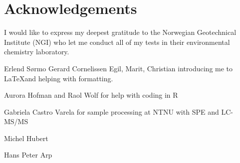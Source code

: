 \newpage
{}
\section*{Acknowledgements}
I would like to express my deepest gratitude to the Norwegian Geotechnical Institute (NGI) who let me conduct all of my tests in their environmental chemistry laboratory.

Erlend Sørmo
Gerard Cornelissen
Egil, Marit, Christian introducing me to  \LaTeX and helping with formatting.

Aurora Hofman and Raol Wolf for help with coding in R

Gabriela Castro Varela for sample processing at NTNU with SPE and LC-MS/MS

Michel Hubert

Hans Peter Arp
